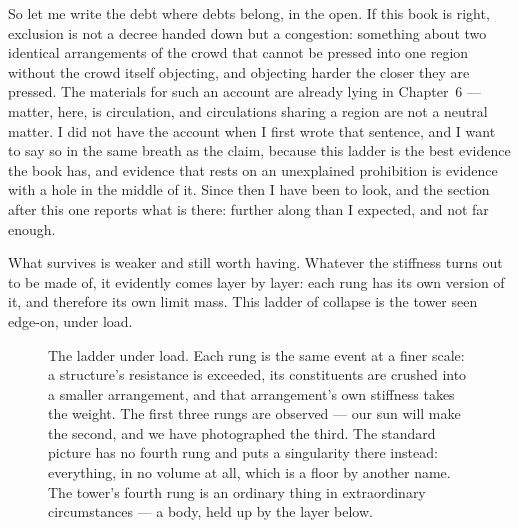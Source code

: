 \documentclass[fontsize=11pt,paper=a4,pagesize=auto,parskip=half-]{scrbook}
\begin{document}
So let me write the debt where debts belong, in the open. If this book is right, exclusion is not a decree handed down but a congestion: something about two identical arrangements of the crowd that cannot be pressed into one region without the crowd itself objecting, and objecting harder the closer they are pressed. The materials for such an account are already lying in Chapter~6 --- matter, here, is circulation, and circulations sharing a region are not a neutral matter. I did not have the account when I first wrote that sentence, and I want to say so in the same breath as the claim, because this ladder is the best evidence the book has, and evidence that rests on an unexplained prohibition is evidence with a hole in the middle of it. Since then I have been to look, and the section after this one reports what is there: further along than I expected, and not far enough.

What survives is weaker and still worth having. Whatever the stiffness turns out to be made of, it evidently comes layer by layer: each rung has its own version of it, and therefore its own limit mass. This ladder of collapse is the tower seen edge-on, under load.

\begin{figure}[htbp]
\centering
{}
\caption{The ladder under load. Each rung is the same event at a finer scale: a structure's resistance is exceeded, its constituents are crushed into a smaller arrangement, and that arrangement's own stiffness takes the weight. The first three rungs are observed --- our sun will make the second, and we have photographed the third. The standard picture has no fourth rung and puts a singularity there instead: everything, in no volume at all, which is a floor by another name. The tower's fourth rung is an ordinary thing in extraordinary circumstances --- a body, held up by the layer below.}
\label{fig:collapseladder}
\end{figure}
\end{document}
